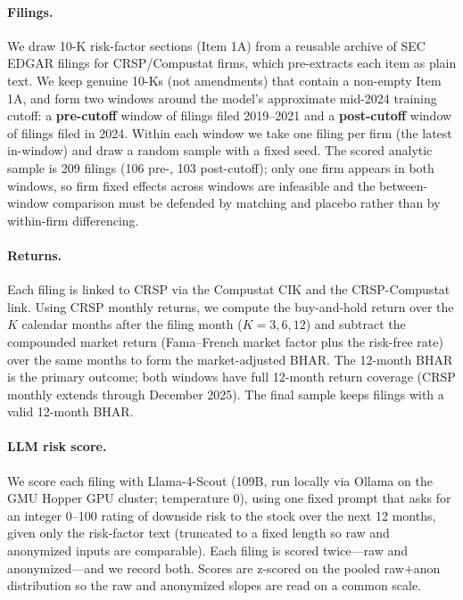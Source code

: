 \documentclass[12pt]{article}
\begin{document}
\paragraph{Filings.} We draw 10-K risk-factor sections (Item 1A) from a reusable archive of
SEC EDGAR filings for CRSP/Compustat firms, which pre-extracts each item as plain text. We
keep genuine 10-Ks (not amendments) that contain a non-empty Item 1A, and form two windows
around the model's approximate mid-2024 training cutoff: a \textbf{pre-cutoff} window of
filings filed 2019--2021 and a \textbf{post-cutoff} window of filings filed in 2024. Within
each window we take one filing per firm (the latest in-window) and draw a random sample with a
fixed seed. The scored analytic sample is 209 filings (106 pre-, 103 post-cutoff); only one
firm appears in both windows, so firm fixed effects across windows are infeasible and the
between-window comparison must be defended by matching and placebo rather than by
within-firm differencing.

\paragraph{Returns.} Each filing is linked to CRSP via the Compustat CIK and the
CRSP-Compustat link. Using CRSP monthly returns, we compute the buy-and-hold return over the
$K$ calendar months after the filing month ($K=3,6,12$) and subtract the compounded market
return (Fama--French market factor plus the risk-free rate) over the same months to form the
market-adjusted BHAR. The 12-month BHAR is the primary outcome; both windows have full
12-month return coverage (CRSP monthly extends through December 2025). The final sample keeps
filings with a valid 12-month BHAR.

\paragraph{LLM risk score.} We score each filing with Llama-4-Scout (109B, run locally via
Ollama on the GMU Hopper GPU cluster; temperature 0), using one fixed prompt that asks for an
integer 0--100 rating of downside risk to the stock over the next 12 months, given only the
risk-factor text (truncated to a fixed length so raw and anonymized inputs are comparable).
Each filing is scored twice---raw and anonymized---and we record both. Scores are z-scored on
the pooled raw$+$anon distribution so the raw and anonymized slopes are read on a common
scale.
\end{document}
